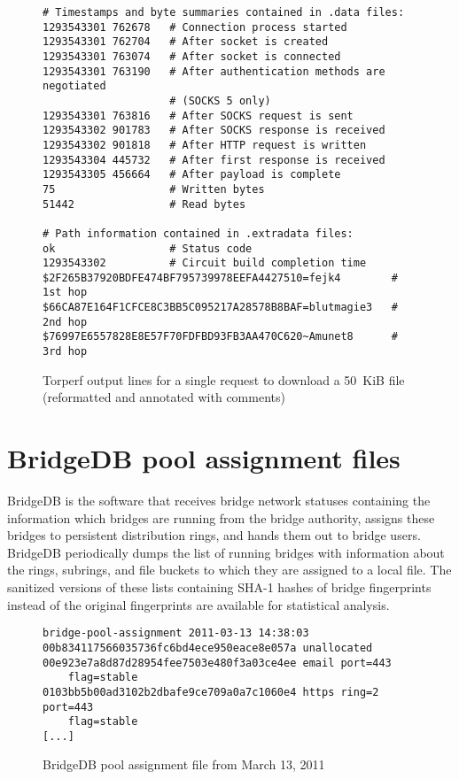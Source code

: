 \documentclass{article}
\begin{document}
\begin{figure}
\begin{verbatim}
# Timestamps and byte summaries contained in .data files:
1293543301 762678   # Connection process started
1293543301 762704   # After socket is created
1293543301 763074   # After socket is connected
1293543301 763190   # After authentication methods are negotiated
                    # (SOCKS 5 only)
1293543301 763816   # After SOCKS request is sent
1293543302 901783   # After SOCKS response is received
1293543302 901818   # After HTTP request is written
1293543304 445732   # After first response is received
1293543305 456664   # After payload is complete
75                  # Written bytes
51442               # Read bytes

# Path information contained in .extradata files:
ok                  # Status code
1293543302          # Circuit build completion time
$2F265B37920BDFE474BF795739978EEFA4427510=fejk4        # 1st hop
$66CA87E164F1CFCE8C3BB5C095217A28578B8BAF=blutmagie3   # 2nd hop
$76997E6557828E8E57F70FDFBD93FB3AA470C620~Amunet8      # 3rd hop
\end{verbatim}
\vspace{-1em}
\caption{Torperf output lines for a single request to download a 50~KiB
file (reformatted and annotated with comments)}
\label{fig:torperf}
\end{figure}

\section{BridgeDB pool assignment files}

BridgeDB is the software that receives bridge network statuses containing
the information which bridges are running from the bridge authority,
assigns these bridges to persistent distribution rings, and hands them out
to bridge users.
BridgeDB periodically dumps the list of running bridges with information
about the rings, subrings, and file buckets to which they are assigned to
a local file.
The sanitized versions of these lists containing SHA-1 hashes of bridge
fingerprints instead of the original fingerprints are available for
statistical analysis.

\begin{figure}
\begin{verbatim}
bridge-pool-assignment 2011-03-13 14:38:03
00b834117566035736fc6bd4ece950eace8e057a unallocated
00e923e7a8d87d28954fee7503e480f3a03ce4ee email port=443
    flag=stable
0103bb5b00ad3102b2dbafe9ce709a0a7c1060e4 https ring=2 port=443
    flag=stable
[...]
\end{verbatim}
\vspace{-1em}
\caption{BridgeDB pool assignment file from March 13, 2011}
\label{fig:bridgeassignments}
\end{figure}
\end{document}
